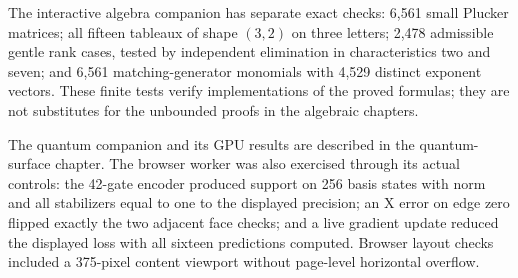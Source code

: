 The interactive algebra companion has separate exact checks: 6,561 small Plucker matrices; all fifteen tableaux of shape \((3,2)\) on three letters; 2,478 admissible gentle rank cases, tested by independent elimination in characteristics two and seven; and 6,561 matching-generator monomials with 4,529 distinct exponent vectors. These finite tests verify implementations of the proved formulas; they are not substitutes for the unbounded proofs in the algebraic chapters.

The quantum companion and its GPU results are described in the quantum-surface chapter. The browser worker was also exercised through its actual controls: the 42-gate encoder produced support on 256 basis states with norm and all stabilizers equal to one to the displayed precision; an X error on edge zero flipped exactly the two adjacent face checks; and a live gradient update reduced the displayed loss with all sixteen predictions computed. Browser layout checks included a 375-pixel content viewport without page-level horizontal overflow.
